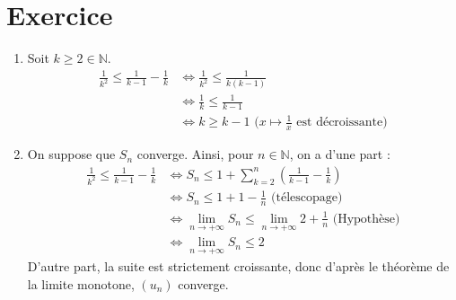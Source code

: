 \documentclass{report}
\begin{document}
\setcounter{chapter}{14}

\setcounter{section}{1}
\section{Exercice}
\begin{enumerate}
    \item Soit $k \geq 2 \in \mathbb{N}$. \\
    \begin{align*}
        \frac{1}{k^2} \leq \frac{1}{k-1} - \frac{1}{k} &\Leftrightarrow \frac{1}{k^2} \leq \frac{1}{k(k-1)} \\
        &\Leftrightarrow \frac{1}{k} \leq \frac{1}{k-1} \\
        &\Leftrightarrow k \geq k-1 \text{ ($x \mapsto \frac{1}{x}$ est décroissante)}
    \end{align*}

    \item On suppose que $S_n$ converge. Ainsi, pour $n \in \mathbb{N}$, on a d'une part : 
    \begin{align*}
        \frac{1}{k^2} \leq \frac{1}{k-1} - \frac{1}{k}
        &\Leftrightarrow S_n \leq 1 + \sum_{k=2}^{n} \left( \frac{1}{k-1} - \frac{1}{k} \right) \\
        &\Leftrightarrow S_n \leq 1 + 1 - \frac{1}{n} \text{ (télescopage)} \\
        &\Leftrightarrow \lim_{n \to +\infty} S_n \leq \lim_{n \to +\infty} 2 + \frac{1}{n} \text{ (Hypothèse)}\\
        &\Leftrightarrow \lim_{n \to +\infty} S_n \leq 2
    \end{align*}
    D'autre part, la suite est strictement croissante, donc d'après le théorème de la limite monotone, $(u_n)$ converge. 
\end{enumerate}

\setcounter{section}{5}
\end{document}

